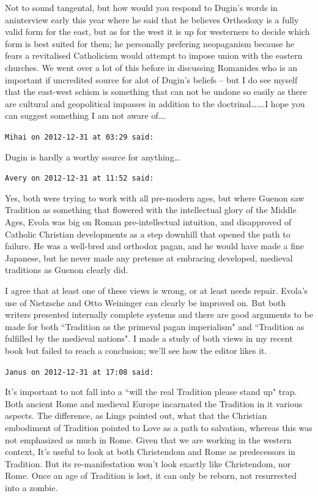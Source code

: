 \begin{footnotesize}
\begin{sffamily}
Not to sound tangental, but how would you respond to Dugin's words in aninterview early this year where he said that he believes Orthodoxy is a fully valid form for the east, but as for the west it is up for westerners to decide which form is best suited for them; he personally prefering neopaganism because he fears a revitalised Catholicism would attempt to impose union with the eastern churches. We went over a lot of this before in discussing Romanides who is an important if uncredited source for alot of Dugin's beliefs – but I do see myself that the east-west schism is something that can not be undone so easily as there are cultural and geopolitical impasses in addition to the doctrinal…….I hope you can suggest something I am not aware of….


\hfill

\texttt{Mihai on 2012-12-31 at 03:29 said: }

Dugin is hardly a worthy source for anything…


\hfill

\texttt{Avery on 2012-12-31 at 11:52 said: }

Yes, both were trying to work with all pre-modern ages, but where Guenon saw Tradition as something that flowered with the intellectual glory of the Middle Ages, Evola was big on Roman pre-intellectual intuition, and disapproved of Catholic Christian developments as a step downhill that opened the path to failure. He was a well-bred and orthodox pagan, and he would have made a fine Japanese, but he never made any pretense at embracing developed, medieval traditions as Guenon clearly did.

I agree that at least one of these views is wrong, or at least needs repair. Evola's use of Nietzsche and Otto Weininger can clearly be improved on. But both writers presented internally complete systems and there are good arguments to be made for both ``Tradition as the primeval pagan imperialism" and ``Tradition as fulfilled by the medieval nations". I made a study of both views in my recent book but failed to reach a conclusion; we'll see how the editor likes it.


\hfill

\texttt{Janus on 2012-12-31 at 17:08 said: }

It's important to not fall into a ``will the real Tradition please stand up" trap. Both ancient Rome and medieval Europe incarnated the Tradition in it various aspects. The difference, as Lings pointed out, what that the Christian embodiment of Tradition pointed to Love as a path to salvation, whereas this was not emphasized as much in Rome. Given that we are working in the western context, It's useful to look at both Christendom and Rome as predecessors in Tradition. But its re-manifestation won't look exactly like Christendom, nor Rome. Once an age of Tradition is lost, it can only be reborn, not resurrected into a zombie.



\end{sffamily}
\end{footnotesize}
